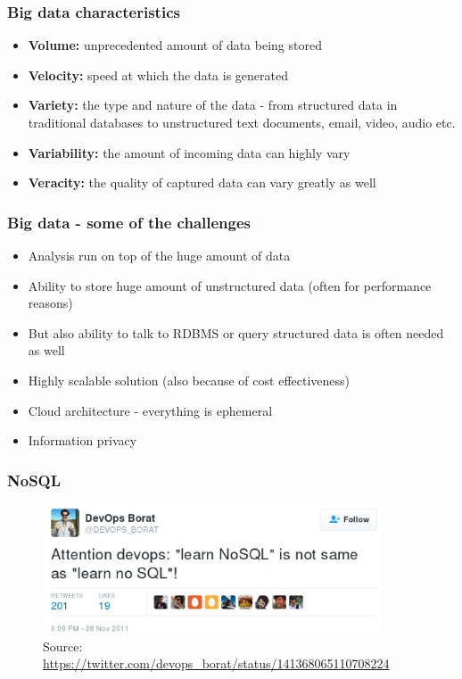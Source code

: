 \documentclass[10pt,utf8]{beamer}
\begin{document}
\begin{frame}
	\frametitle{Big data characteristics}
	\begin{itemize}
		\pause
		\item \textbf{Volume:} unprecedented amount of data being stored
		\pause
		\item \textbf{Velocity:} speed at which the data is generated
		\pause
		\item \textbf{Variety:} the type and nature of the data - from structured data in traditional databases to unstructured text documents, email, video, audio etc.
		\pause
		\item \textbf{Variability:} the amount of incoming data can highly vary
		\pause
		\item \textbf{Veracity:} the quality of captured data can vary greatly as well
	\end{itemize}
\end{frame}

\begin{frame}
	\frametitle{Big data - some of the challenges}
		\begin{itemize}
			\item Analysis run on top of the huge amount of data
			\item Ability to store huge amount of unstructured data (often for performance reasons)
			\item But also ability  to talk to RDBMS or query structured data is often needed as well
			\item Highly scalable solution (also because of cost effectiveness)
			\item Cloud architecture - everything is ephemeral
			\item Information privacy
		\end{itemize}
\end{frame}

\begin{frame}
	\frametitle{NoSQL}
	 {
		\begin{figure}
			\centering
			\includegraphics[width=10cm]{./img/borat_learn_nosql.eps}
			\caption{\tiny{Source: \url{https://twitter.com/devops_borat/status/141368065110708224}}}
		\end{figure}
	}
\end{frame}
\end{document}

